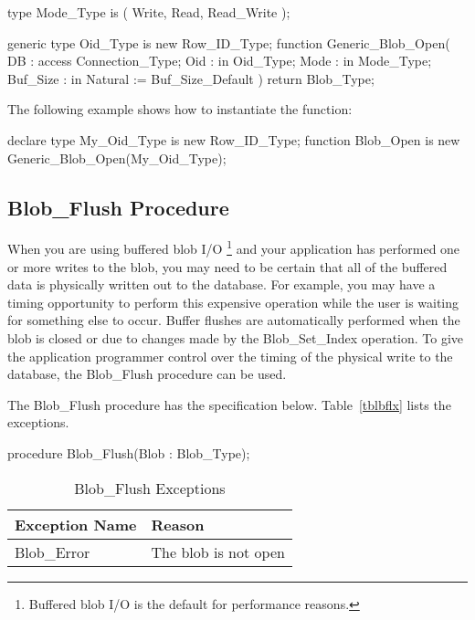 \documentclass[english,letterpaper]{book}
\begin{document}
\begin{Code}
type Mode_Type is (
   Write,
   Read,
   Read_Write
);

generic
   type Oid_Type is new Row_ID_Type;
function Generic_Blob_Open(
   DB :       access Connection_Type;
   Oid :      in     Oid_Type;
   Mode :     in     Mode_Type;
   Buf_Size : in     Natural := Buf_Size_Default
) return Blob_Type;
\end{Code}

The following example shows how to instantiate the function:

\begin{Example}
declare
type My_Oid_Type is new Row_ID_Type;
function Blob_Open is new
   Generic_Blob_Open(My_Oid_Type);
\end{Example}

\subsection{Blob\_Flush Procedure}

When you are using buffered blob I/O%
\footnote{Buffered blob I/O is the default for performance reasons.%
} and your application has performed one or more writes to the blob,
you may need to be certain that all of the buffered data is physically
written out to the database. For example, you may have a timing opportunity
to perform this expensive operation while the user is waiting for
something else to occur. Buffer flushes are automatically performed
when the blob is closed or due to changes made by the Blob\_Set\_Index
operation. To give the application programmer control over the timing
of the physical write to the database, the Blob\_Flush procedure can
be used.%

The Blob\_Flush procedure has the specification below. Table~\ref{tblbflx} lists the exceptions.

\begin{Code}
procedure Blob_Flush(Blob : Blob_Type);
\end{Code}

\begin{table}
   \begin{center}
      \begin{tabular}{ll}
         Exception Name       &  Reason\\
         \hline 
         Blob\_Error          &  The blob is not open\\
      \end{tabular}
   \end{center}
   \caption{Blob\_Flush Exceptions}\label{t:blbflx}
\end{table}
\end{document}

